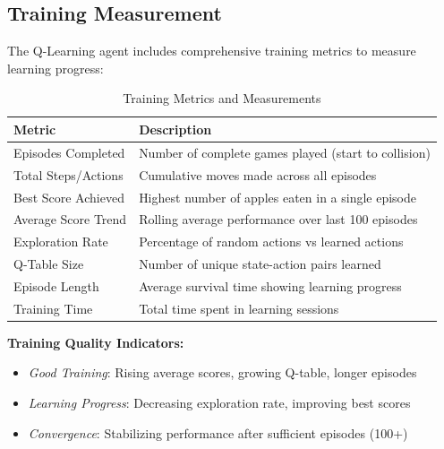 \documentclass[11pt,a4paper]{article}
\begin{document}
\subsection{Training Measurement}
The Q-Learning agent includes comprehensive training metrics to measure learning progress:

\begin{table}[H]
\centering
\caption{Training Metrics and Measurements}
\begin{tabular}{@{}ll@{}}
\toprule
\textbf{Metric} & \textbf{Description} \\
\midrule
Episodes Completed & Number of complete games played (start to collision) \\
Total Steps/Actions & Cumulative moves made across all episodes \\
Best Score Achieved & Highest number of apples eaten in a single episode \\
Average Score Trend & Rolling average performance over last 100 episodes \\
Exploration Rate & Percentage of random actions vs learned actions \\
Q-Table Size & Number of unique state-action pairs learned \\
Episode Length & Average survival time showing learning progress \\
Training Time & Total time spent in learning sessions \\
\bottomrule
\end{tabular}
\end{table}

\textbf{Training Quality Indicators:}
\begin{itemize}
\item \textit{Good Training}: Rising average scores, growing Q-table, longer episodes
\item \textit{Learning Progress}: Decreasing exploration rate, improving best scores
\item \textit{Convergence}: Stabilizing performance after sufficient episodes (100+)
\end{itemize}
\end{document}
